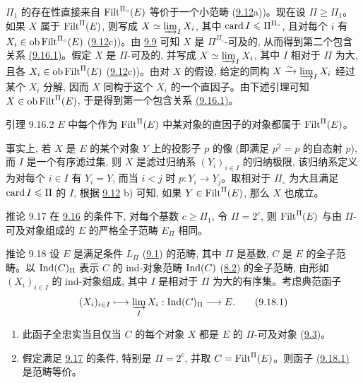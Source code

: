 $\Pi_1$ 的存在性直接来自 $\operatorname{Filt}^{\Pi_\circ}(E)$ 等价于一个小范畴 (\hyperref[I.def9.12]{9.12}a))。现在设 $\Pi\geq \Pi_1$。如果 $X$ 属于 $\operatorname{Filt}^{\Pi}(E)$, 则写成 $X\simeq \varinjlim_I X_i$, 其中 $\operatorname{card} I\leqslant
\Pi^{\Pi_\circ}$, 且对每个 $i$ 有 $X_i\in \operatorname{ob} \operatorname{Filt}^{\Pi_\circ}(E)$ (\hyperref[I.def9.12]{9.12}c))。由 \hyperref[I.cor9.9]{9.9} 可知 $X$ 是 $\Pi^{\Pi_\circ}$-可及的, 从而得到第二个包含关系 \hyperlink{sga4.exp.I.equation.9.16.1}{(9.16.1)}。假定 $X$ 是 $\Pi$-可及的, 并写成 $X\simeq
\varinjlim_I X_i$, 其中 $I$ 相对于 $\Pi$ 为大, 且各 $X_i\in \operatorname{ob}
\operatorname{Filt}^{\Pi}(E)$ (\hyperref[I.def9.12]{9.12}c))。由对 $X$ 的假设, 给定的同构 $X\xrightarrow{\sim} \varinjlim_I X_i$ 经过某个 $X_i$ 分解, 因而 $X$ 同构于这个 $X_i$ 的一个直因子。由下述引理可知 $X\in \operatorname{ob} \operatorname{Filt}^{\Pi}(E)$, 于是得到第一个包含关系 \hyperlink{sga4.exp.I.equation.9.16.1}{(9.16.1)}。

\begin{enonce*}{引理 9.16.2}
$E$ 中每个作为 $\operatorname{Filt}^{\Pi}(E)$ 中某对象的直因子的对象都属于 $\operatorname{Filt}^{\Pi}(E)$。
\end{enonce*}

事实上, 若 $X$ 是 $E$ 的某个对象 $Y$ 上的投影子 $p$ 的像 (即满足 $p^2=p$ 的自态射 $p$), 而 $I$ 是一个有序\pageoriginale 滤过集, 则 $X$ 是滤过归纳系 $(Y_i)_{i\in I}$ 的归纳极限, 该归纳系定义为对每个 $i\in I$ 有 $Y_i=Y$, 而当 $i<j$ 时 $p:Y_i\rightarrow Y_j$。取相对于 $\Pi_\circ$ 为大且满足 $\operatorname{card} I\leqslant \Pi$ 的 $I$, 根据 \hyperref[I.def9.12]{9.12} b) 可知, 如果 $Y\in \operatorname{Filt}^{\Pi}(E)$, 那么 $X$ 也成立。

\begin{enonce*}{推论 9.17}
在 \hyperref[I.prop9.16]{9.16} 的条件下, 对每个基数 $c\geq
\Pi_1$, 令 $\Pi=2^c$, 则 $\operatorname{Filt}^{\Pi}(E)$ 与由 $\Pi$-可及对象组成的 $E$ 的严格全子范畴 $E_{\Pi}$ 相同。
\end{enonce*}

\begin{enonce*}{推论 9.18}
设 $E$ 是满足条件 $L_{\Pi}$ (\hyperref[I.def9.1]{9.1}) 的范畴, 其中 $\Pi$ 是基数, $C$ 是 $E$ 的全子范畴。以 $\operatorname{Ind}(C)_{\Pi}$ 表示 $C$ 的 ind-对象范畴 $\operatorname{Ind}(C)$ (\hyperref[I.sec8.2]{8.2}) 的全子范畴, 由形如 $(X_i)_{i\in I}$ 的 ind-对象组成, 其中 $I$ 是相对于 $\Pi$ 为大的有序集。考虑典范函子
\hypertarget{sga4.exp.I.equation.9.18.1}{}\begin{equation}
(X_i)_{i\in I}\longmapsto \varinjlim_I
X_i:\operatorname{Ind}(C)_{\Pi}\longrightarrow E{}.\tag{9.18.1}
\end{equation}
\begin{enumerate}
\renewcommand{\theenumi}{\alph{enumi}}
\renewcommand{\labelenumi}{\theenumi)}
\item 此函子全忠实当且仅当 $C$ 的每个对象 $X$ 都是 $E$ 的 $\Pi$-可及对象 (\hyperref[I.def9.3]{9.3})。

\item 假定满足 \hyperref[I.cor9.17]{9.17} 的条件, 特别是 $\Pi=2^c$, 并取 $C=\operatorname{Filt}^{\Pi}(E)$。则函子 \hyperlink{sga4.exp.I.equation.9.18.1}{(9.18.1)} 是范畴等价。
\end{enumerate}
\end{enonce*}

